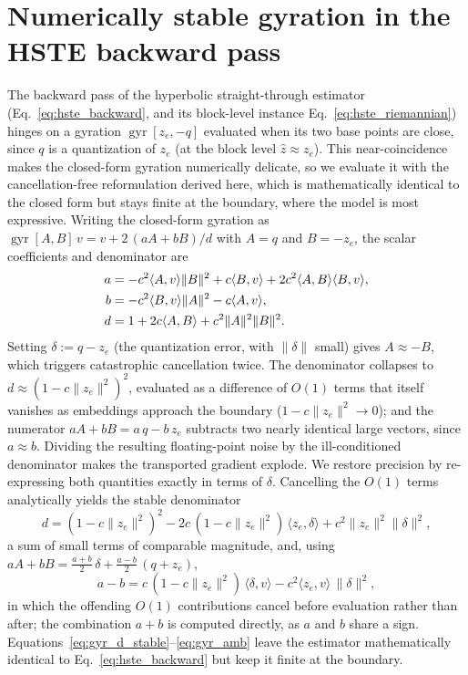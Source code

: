 \documentclass[12pt]{report}
\begin{document}
\section{Numerically stable gyration in the HSTE backward pass}
\label{app:gyration}
The backward pass of the hyperbolic straight-through estimator (Eq.~\ref{eq:hste_backward}, and its block-level instance Eq.~\ref{eq:hste_riemannian}) hinges on a gyration $\operatorname{gyr}[z_e,-q]$ evaluated when its two base points are close, since $q$ is a quantization of $z_e$ (at the block level $\hat z\approx z_e$). This near-coincidence makes the closed-form gyration numerically delicate, so we evaluate it with the cancellation-free reformulation derived here, which is mathematically identical to the closed form but stays finite at the boundary, where the model is most expressive. Writing the closed-form gyration as $\operatorname{gyr}[A,B]\,v = v + 2\,(aA+bB)/d$ with $A=q$ and $B=-z_e$, the scalar coefficients and denominator are
\begin{align}
    a &= -c^2\langle A,v\rangle\|B\|^2 + c\langle B,v\rangle + 2c^2\langle A,B\rangle\langle B,v\rangle,\notag\\
    b &= -c^2\langle B,v\rangle\|A\|^2 - c\langle A,v\rangle,\notag\\
    d &= 1 + 2c\langle A,B\rangle + c^2\|A\|^2\|B\|^2 .
\end{align}
Setting $\delta := q - z_e$ (the quantization error, with $\|\delta\|$ small) gives $A\approx -B$, which triggers catastrophic cancellation twice. The denominator collapses to $d\approx(1-c\|z_e\|^2)^2$, evaluated as a difference of $O(1)$ terms that itself vanishes as embeddings approach the boundary ($1-c\|z_e\|^2\to 0$); and the numerator $aA+bB = a\,q - b\,z_e$ subtracts two nearly identical large vectors, since $a\approx b$. Dividing the resulting floating-point noise by the ill-conditioned denominator makes the transported gradient explode. We restore precision by re-expressing both quantities exactly in terms of $\delta$. Cancelling the $O(1)$ terms analytically yields the stable denominator
\begin{equation}
    \label{eq:gyr_d_stable}
    d = (1-c\|z_e\|^2)^2 - 2c\,(1-c\|z_e\|^2)\,\langle z_e,\delta\rangle + c^2\|z_e\|^2\|\delta\|^2,
\end{equation}
a sum of small terms of comparable magnitude, and, using $aA+bB = \tfrac{a+b}{2}\,\delta + \tfrac{a-b}{2}\,(q+z_e)$,
\begin{equation}
    \label{eq:gyr_amb}
    a-b = c\,(1-c\|z_e\|^2)\,\langle\delta,v\rangle - c^2\langle z_e,v\rangle\,\|\delta\|^2 ,
\end{equation}
in which the offending $O(1)$ contributions cancel before evaluation rather than after; the combination $a+b$ is computed directly, as $a$ and $b$ share a sign. Equations~\ref{eq:gyr_d_stable}--\ref{eq:gyr_amb} leave the estimator mathematically identical to Eq.~\ref{eq:hste_backward} but keep it finite at the boundary.
\end{document}

